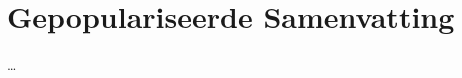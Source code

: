 \chapter{Gepopulariseerde Samenvatting}\label{ch:popabstractnl}

\ldots

\instructionspopabstract


\cleardoublepage
